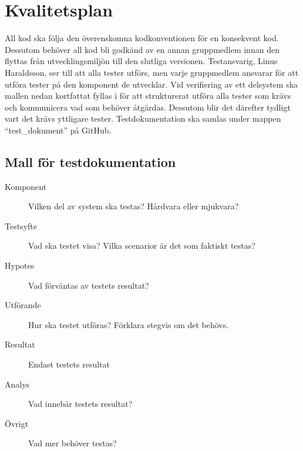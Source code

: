 \documentclass[a4paper]{article}
\begin{document}

\section{Kvalitetsplan}
\label{sec:kvalitesplan}

All kod ska följa den överenskomna kodkonventionen för en konsekvent kod. Dessutom behöver all kod bli godkänd av en annan gruppmedlem innan den flyttas från utvecklingsmiljön till den slutliga versionen. Testansvarig, Linus Haraldsson, ser till att alla tester utförs, men varje gruppmedlem ansvarar för att utföra tester på den komponent de utvecklar.
\newline
\newline
Vid verifiering av ett delsystem ska mallen nedan kortfattat fyllas i för att strukturerat utföra alla tester som krävs och kommunicera vad som behöver åtgärdas. Dessutom blir det därefter tydligt vart det krävs yttligare tester. Testdokumentation ska samlas under mappen “test\_dokument” på GitHub.
\newline
\newline
\newline
\newline
\subsection*{Mall för testdokumentation}
\begin{description}
    \item[Komponent]{Vilken del av system ska testas? Hårdvara eller mjukvara?}
    \item[Testsyfte]{Vad ska testet visa? Vilka scenarior är det som faktiskt testas?}
    \item[Hypotes]{Vad förväntas av testets resultat? }
    \item[Utförande]{Hur ska testet utföras? Förklara stegvis om det behövs.}
    \item[Resultat]{Endast testets resultat }
    \item[Analys]{Vad innebär testets resultat?  }
    \item[Övrigt]{Vad mer behöver testas? }
    
\end{description}
\end{document}
